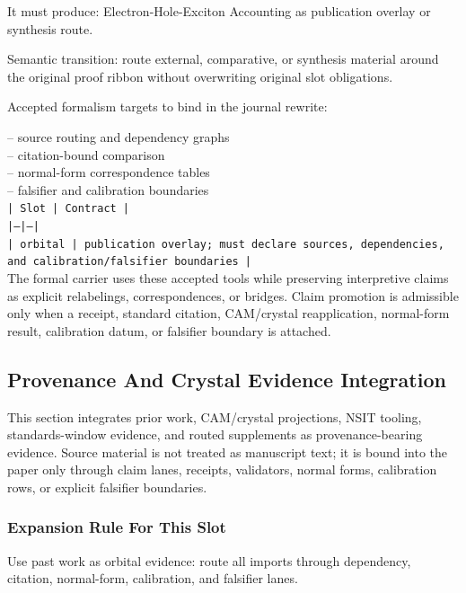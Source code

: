 \documentclass[11pt]{article}
\begin{document}
It must produce: Electron-Hole-Exciton Accounting as publication overlay or synthesis route.

Semantic transition: route external, comparative, or synthesis material around the original proof ribbon without overwriting original slot obligations.

Accepted formalism targets to bind in the journal rewrite:

\noindent{}-- source routing and dependency graphs\\
\noindent{}-- citation-bound comparison\\
\noindent{}-- normal-form correspondence tables\\
\noindent{}-- falsifier and calibration boundaries\\

\noindent\texttt{| Slot | Contract |}\\
\noindent\texttt{|---|---|}\\
\noindent\texttt{| orbital | publication overlay; must declare sources, dependencies, and calibration/falsifier boundaries |}\\

The formal carrier uses these accepted tools while preserving interpretive
claims as explicit relabelings, correspondences, or bridges. Claim promotion is admissible only when a receipt, standard citation,
CAM/crystal reapplication, normal-form result, calibration datum, or falsifier
boundary is attached.

\subsection*{Provenance And Crystal Evidence Integration}

This section integrates prior work, CAM/crystal projections, NSIT tooling,
standards-window evidence, and routed supplements as provenance-bearing
evidence. Source material is not treated as manuscript text; it is bound into
the paper only through claim lanes, receipts, validators, normal forms,
calibration rows, or explicit falsifier boundaries.

\subsubsection*{Expansion Rule For This Slot}

Use past work as orbital evidence: route all imports through dependency, citation, normal-form, calibration, and falsifier lanes.
\end{document}
